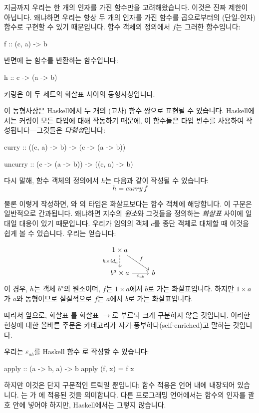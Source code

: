 \documentclass[DaoFP]{subfiles}
\begin{document}
\begin{CJK*}{UTF8}{gbsn}
지금까지 우리는 한 개의 인자를 가진 함수만을 고려해왔습니다. 이것은 진짜 제한이 아닙니다. 왜냐하면 우리는 항상 두 개의 인자를 가진 함수를 곱으로부터의 (단일-인자) 함수로 구현할 수 있기 때문입니다. 함수 객체의 정의에서 $f$는 그러한 함수입니다:
\begin{haskell}
f :: (c, a) -> b
\end{haskell}
반면에 는 함수를 반환하는 함수입니다:
\begin{haskell}
h :: c -> (a -> b)
\end{haskell}
커링은 이 두 세트의 화살표 사이의 동형사상입니다.

이 동형사상은 Haskell에서 두 개의 (고차) 함수 쌍으로 표현될 수 있습니다. Haskell에서는 커링이 모든 타입에 대해 작동하기 때문에, 이 함수들은 타입 변수를 사용하여 작성됩니다—그것들은 \emph{다형성}입니다:
\begin{haskell}
curry   :: ((c, a) -> b)   -> (c -> (a -> b))
\end{haskell}

\begin{haskell}
uncurry :: (c -> (a -> b)) -> ((c, a) -> b)
\end{haskell}
다시 말해, 함수 객체의 정의에서 $h$는 다음과 같이 작성될 수 있습니다:
\[ h = curry\, f \]

물론 이렇게 작성하면, 와 의 타입은 화살표보다는 함수 객체에 해당합니다. 이 구분은 일반적으로 간과됩니다. 왜냐하면 지수의 \emph{원소}와 그것들을 정의하는 \emph{화살표} 사이에 일대일 대응이 있기 때문입니다. 우리가 임의의 객체 $c$를 종단 객체로 대체할 때 이것을 쉽게 볼 수 있습니다. 우리는 얻습니다:

\[
 \begin{tikzcd}
 1 \times a
 \arrow[d, dashed, "h \times id_a"']
 \arrow[rd, "f"]
 \\
 b^a \times a
 \arrow[r, "\varepsilon_{a b}"']
& b
 \end{tikzcd}
\]
이 경우, $h$는 객체 $b^a$의 원소이며, $f$는 $1 \times a$에서 $b$로 가는 화살표입니다. 하지만 $1 \times a$가 $a$와 동형이므로 실질적으로 $f$는 $a$에서 $b$로 가는 화살표입니다.

따라서 앞으로, 화살표 \hask{->}를 화살표 $\to$로 부르되 크게 구분하지 않을 것입니다. 이러한 현상에 대한 올바른 주문은 카테고리가 자기-풍부하다(self-enriched)고 말하는 것입니다.

우리는 $\varepsilon_{a b}$를 Haskell 함수 로 작성할 수 있습니다:
\begin{haskell}
apply :: (a -> b, a) -> b
apply (f, x) = f x
\end{haskell}
하지만 이것은 단지 구문적인 트릭일 뿐입니다: 함수 적용은 언어 내에 내장되어 있습니다. 는 가 에 적용된 것을 의미합니다. 다른 프로그래밍 언어에서는 함수의 인자를 괄호 안에 넣어야 하지만, Haskell에서는 그렇지 않습니다.


\end{CJK*}
\end{document}
